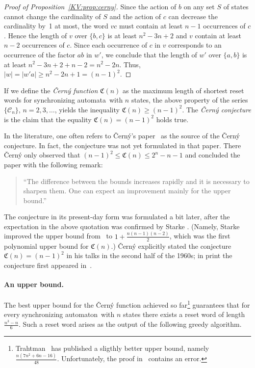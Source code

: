 \documentclass{irmaart}
\newcommand{\sa}{synchronizing au\-tom\-a\-ta}
\newcommand{\san}{synchronizing au\-tom\-a\-ton}
\theoremstyle{plain}
\begin{document}
\begin{proof}[Proof of Proposition~\ref{KV:prop:cerny}]
Since the action of $b$ on any set $S$ of states cannot change the
cardinality of $S$ and the action of $c$ can decrease the
cardinality by~1 at most, the word $vc$ must contain at least
$n-1$ occurrences of $c$. Hence the length of $v$ over $\{b,c\}$
is at least $n^2-3n+2$ and $v$ contain at least $n-2$ occurrences
of $c$. Since each occurrence of $c$ in $v$ corresponds to an
occurrence of the factor $ab$ in $w'$, we conclude that the length
of $w'$ over $\{a,b\}$ is at least $n^2-3n+2+n-2=n^2-2n$. Thus,
$|w|=|w'a|\ge n^2-2n+1=(n-1)^2$.
\end{proof}

If we define the \emph{\v{C}ern\'y function} $\mathfrak{C}(n)$ as the maximum length of shortest reset words for
\sa\ with $n$ states, the above property of the series $\{\mathcal{C}_{n}\}$,
$n=2,3,\dotsc$, yields the inequality $\mathfrak{C}(n)\ge(n-1)^2$. The
\emph{\v{C}ern\'{y} conjecture} is the
claim that the equality $\mathfrak{C}(n)=(n-1)^2$ holds true.

In the literature, one often refers to \v{C}ern\'{y}'s paper~\cite{Cerny:1964}
as the source of the \v{C}ern\'{y} conjecture. In fact, the conjecture was not
yet formulated in that paper. There \v{C}ern\'{y} only observed that
$(n-1)^2\le \mathfrak{C}(n)\le 2^n-n-1$ and concluded the paper with the
following remark:
\begin{quote}
``The difference between the bounds increases rapidly and it is necessary to
sharpen them. One can expect an improvement mainly for the upper bound.''
\end{quote}
The conjecture in its present-day form was formulated a bit later, after the
expectation in the above quotation was confirmed by Starke \cite{Starke:1966}.
(Namely, Starke improved the upper bound from~\cite{Cerny:1964} to
$1+\frac{n(n-1)(n-2)}2$, which was the first polynomial upper bound for
$\mathfrak{C}(n)$.) \v{C}ern\'{y} explicitly stated the conjecture
$\mathfrak{C}(n)=(n-1)^2$ in his talks in the second half of the 1960s; in
print the conjecture first appeared in~\cite{Cerny&Piricka&Rosenauerova:1971}.

\paragraph*{An upper bound.} The best upper bound for the \v{C}ern\'{y}
function achieved so far\footnote{Trahtman~\cite{Trahtman:2011} has published a
sligthly better upper bound, namely $\frac{n(7n^2+6n-16)}{48}$. Unfortunately,
the proof in~\cite{Trahtman:2011} contains an error.} guarantees that for every
\san\ with $n$ states there exists a reset word of length $\frac{n^3-n}6$. Such
a reset word arises as the output of the following greedy
algorithm.
\end{document}
